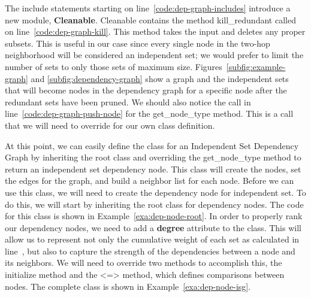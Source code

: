 

The {\ttfamily include} statements starting on line~\ref{code:dep-graph-includes} introduce a new module, {\bfseries Cleanable}. Cleanable contains the method {\ttfamily kill\_redundant} called on line~\ref{code:dep-graph-kill}. This method takes the input and deletes any proper subsets. This is useful in our case since every single node in the two-hop neighborhood will be considered an independent set; we would prefer to limit the number of sets to only those sets of maximum size. Figures~\ref{subfig:example-graph} and \ref{subfig:dependency-graph} show a graph and the independent sets that will become nodes in the dependency graph for a specific node after the redundant sets have been pruned. We should also notice the call in line~\ref{code:dep-graph-push-node} for the {\ttfamily get\_node\_type} method. This is a call that we will need to override for our own class definition. 



At this point, we can easily define the class for an Independent Set Dependency Graph by inheriting the root class and overriding the {\ttfamily get\_node\_type} method to return an independent set dependency node. This class will create the nodes, set the edges for the graph, and build a neighbor list for each node. Before we can use this class, we will need to create the dependency node for independent set. To do this, we will start by inheriting the root class for dependency nodes. The code for this class is shown in Example~\ref{exa:dep-node-root}. In order to properly rank our dependency nodes, we need to add a {\bfseries degree} attribute to the class. This will allow us to represent not only the cumulative weight of each set as calculated in line~, but also to capture the strength of the dependencies between a node and its neighbors. We will need to override two methods to accomplish this, the {\ttfamily initialize} method and the {\ttfamily <=>} method, which defines comparisons between nodes. The complete class is shown in Example~\ref{exa:dep-node-isg}.




